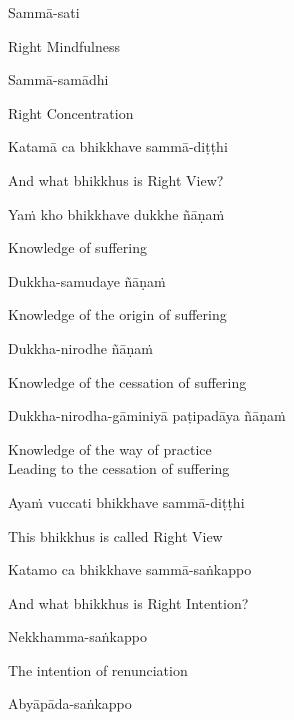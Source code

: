Sammā-sati

\begin{english}
  Right Mindfulness
\end{english}

Sammā-samādhi

\begin{english}
  Right Concentration
\end{english}

Katamā ca bhikkhave sammā-diṭṭhi

\begin{english}
  And what bhikkhus is Right View?
\end{english}

Yaṁ kho bhikkhave dukkhe ñāṇaṁ

\begin{english}
  Knowledge of suffering
\end{english}

Dukkha-samudaye ñāṇaṁ

\begin{english}
  Knowledge of the origin of suffering
\end{english}

Dukkha-nirodhe ñāṇaṁ

\begin{english}
  Knowledge of the cessation of suffering
\end{english}

Dukkha-nirodha-gāminiyā paṭipadāya ñāṇaṁ

\begin{english}
  Knowledge of the way of practice\\
  Leading to the cessation of suffering
\end{english}

Ayaṁ vuccati bhikkhave sammā-diṭṭhi

\begin{english}
  This bhikkhus is called Right View
\end{english}

Katamo ca bhikkhave sammā-saṅkappo

\begin{english}
  And what bhikkhus is Right Intention?
\end{english}

Nekkhamma-saṅkappo

\begin{english}
  The intention of renunciation
\end{english}

Abyāpāda-saṅkappo

